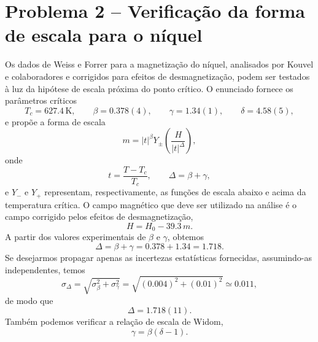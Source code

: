 \documentclass[11pt,a4paper]{article}
\begin{document}
\section*{Problema 2 -- Verificação da forma de escala para o níquel}

Os dados de Weiss e Forrer para a magnetização do níquel, analisados por
Kouvel e colaboradores e corrigidos para efeitos de desmagnetização,
podem ser testados à luz da hipótese de escala próxima do ponto crítico.
O enunciado fornece os parâmetros críticos
%
\begin{equation}
    T_c = 627.4\,\mathrm{K},
    \qquad
    \beta = 0.378(4),
    \qquad
    \gamma = 1.34(1),
    \qquad
    \delta = 4.58(5),
\end{equation}
%
e propõe a forma de escala
%
\begin{equation}
    m
    =
    |t|^\beta
    Y_{\pm}
    \left(
        \frac{H}{|t|^\Delta}
    \right),
    \label{eq:escala_Ni}
\end{equation}
%
onde
%
\begin{equation}
    t
    =
    \frac{T-T_c}{T_c},
    \qquad
    \Delta=\beta+\gamma,
    \label{eq:variaveis_Ni_1}
\end{equation}
%
e $Y_-$ e $Y_+$ representam, respectivamente, as funções de escala
abaixo e acima da temperatura crítica. O campo magnético que deve ser utilizado na análise é o campo corrigido pelos efeitos de
desmagnetização,
%
\begin{equation}
    H = H_0 - 39.3\,m.
    \label{eq:H_corrigido_Ni}
\end{equation}
%
A partir dos valores experimentais de $\beta$ e $\gamma$, obtemos
%
\begin{equation}
    \Delta
    =
    \beta+\gamma
    =
    0.378+1.34
    =
    1.718.
    \label{eq:Delta_Ni}
\end{equation}
%
Se desejarmos propagar apenas as incertezas estatísticas fornecidas,
assumindo-as independentes, temos
%
\begin{equation}
    \sigma_\Delta
    =
    \sqrt{\sigma_\beta^2+\sigma_\gamma^2}
    =
    \sqrt{(0.004)^2+(0.01)^2}
    \simeq0.011,
\end{equation}
%
de modo que
%
\begin{equation}
    \Delta=1.718(11).
\end{equation}
%
Também podemos verificar a relação de escala de Widom,
%
\begin{equation}
    \gamma=\beta(\delta-1).
    \label{eq:Widom_Ni}
\end{equation}
\end{document}
